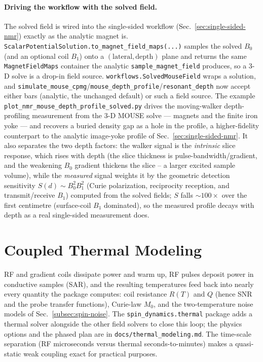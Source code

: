 \documentclass[11pt,oneside]{report}
\newcommand{\code}[1]{\texttt{#1}}
\begin{document}
\paragraph{Driving the workflow with the solved field.} The solved field is wired
into the single-sided workflow (Sec.~\ref{sec:single-sided-nmr}) exactly as the
analytic magnet is. \code{ScalarPotentialSolution.to\_magnet\_field\_maps(...)}
samples the solved \(B_0\) (and an optional coil \(B_1\)) onto a
\((\text{lateral},\text{depth})\) plane and returns the same \code{MagnetFieldMaps}
container the analytic \code{sample\_magnet\_field} produces, so a 3-D solve is a
drop-in field source. \code{workflows.SolvedMouseField} wraps a solution, and
\code{simulate\_mouse\_cpmg}/\code{mouse\_depth\_profile}/\code{resonant\_depth}
now accept either bars (analytic, the unchanged default) or such a field source.
The example \code{plot\_nmr\_mouse\_depth\_profile\_solved.py} drives the
moving-walker depth-profiling measurement from the 3-D MOUSE solve --- magnets and
the finite iron yoke --- and recovers a buried density gap as a hole in the
profile, a higher-fidelity counterpart to the analytic image-yoke profile of
Sec.~\ref{sec:single-sided-nmr}. It also separates the two depth factors: the
walker signal is the \emph{intrinsic} slice response, which rises with depth
(the slice thickness is pulse-bandwidth/gradient, and the weakening \(B_0\)
gradient thickens the slice -- a larger excited sample volume), while the
\emph{measured} signal weights it by the geometric detection sensitivity
\(S(d)\sim B_0^2 B_1^2\) (Curie
polarization, reciprocity reception, and transmit/receive \(B_1\)) computed from
the solved fields; \(S\) falls \(\sim\!100\times\) over the first centimetre
(surface-coil \(B_1\) dominated), so the measured profile decays with depth as a
real single-sided measurement does.

\section{Coupled Thermal Modeling}
\label{subsec:thermal-modeling}

RF and gradient coils dissipate power and warm up, RF pulses deposit power in
conductive samples (SAR), and the resulting temperatures feed back into nearly
every quantity the package computes: coil resistance \(R(T)\) and \(Q\) (hence
SNR and the probe transfer functions), Curie-law \(M_0\), and the
two-temperature noise models of Sec.~\ref{subsec:spin-noise}. The
\code{spin\_dynamics.thermal} package adds a thermal solver alongside the other
field solvers to close this loop; the physics options and the phased plan are
in \code{docs/thermal\_modeling.md}. The time-scale separation (RF microseconds
versus thermal seconds-to-minutes) makes a quasi-static weak coupling exact for
practical purposes.
\end{document}
